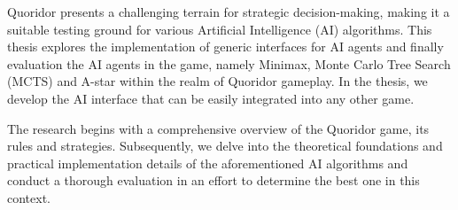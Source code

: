 \documentclass[12pt]{report}
\begin{document}
Quoridor presents a challenging terrain for strategic decision-making, making it a suitable testing ground for various Artificial Intelligence (AI) algorithms. This thesis explores the implementation of generic interfaces for AI agents and finally evaluation the AI agents in the game, namely Minimax, Monte Carlo Tree Search (MCTS) and A-star within the realm of Quoridor gameplay. In the thesis, we develop the AI interface that can be easily integrated into any other game. 

The research begins with a comprehensive overview of the Quoridor game, its rules and strategies. Subsequently, we delve into the theoretical foundations and practical implementation details of the aforementioned AI algorithms and conduct a thorough evaluation in an effort to determine the best one in this context.
\end{document}
